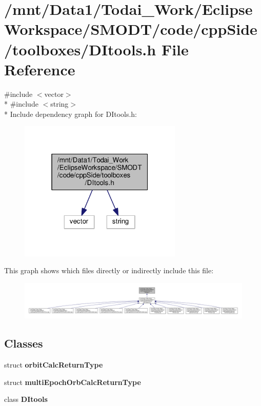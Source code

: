 \section{/mnt/\-Data1/\-Todai\-\_\-\-Work/\-Eclipse\-Workspace/\-S\-M\-O\-D\-T/code/cpp\-Side/toolboxes/\-D\-Itools.h File Reference}
\label{_d_itools_8h}
{\ttfamily \#include $<$vector$>$}\\*
{\ttfamily \#include $<$string$>$}\\*
Include dependency graph for D\-Itools.\-h\-:
\nopagebreak
\begin{figure}[H]
\begin{center}
\leavevmode
\includegraphics[width=220pt]{_d_itools_8h__incl}
\end{center}
\end{figure}
This graph shows which files directly or indirectly include this file\-:
\nopagebreak
\begin{figure}[H]
\begin{center}
\leavevmode
\includegraphics[width=350pt]{_d_itools_8h__dep__incl}
\end{center}
\end{figure}
\subsection*{Classes}
\begin{DoxyCompactItemize}
\item 
struct {\bf orbit\-Calc\-Return\-Type}
\item 
struct {\bf multi\-Epoch\-Orb\-Calc\-Return\-Type}
\item 
class {\bf D\-Itools}
\end{DoxyCompactItemize}
